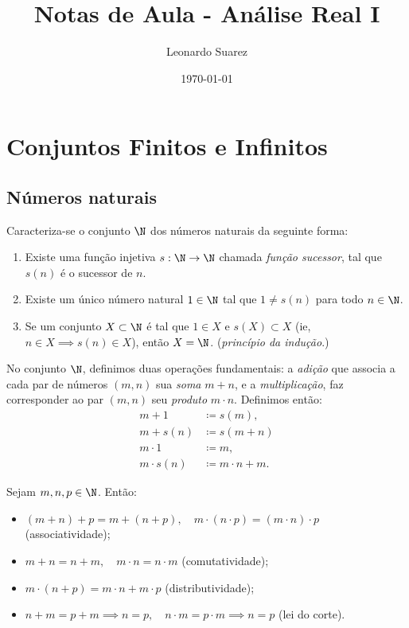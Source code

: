 \documentclass{article}
\title{Notas de Aula - Análise Real I}
\author{Leonardo Suarez}
\date{\today}
\begin{document}
\maketitle
\tableofcontents

\section{Conjuntos Finitos e Infinitos}

\subsection{Números naturais}

Caracteriza-se o conjunto \(\N\) dos números naturais da seguinte forma:

\begin{enumerate}
    \item[\textbf{AI}] Existe uma função injetiva \(s : \N \to \N\) chamada \emph{função sucessor}, tal que \(s(n)\) é o sucessor de \(n\).
    \item[\textbf{AII}] Existe um único número natural \(1 \in \N\) tal que \(1 \neq s(n)\) para todo \(n \in \N\).
    \item[\textbf{AIII}] Se um conjunto \(X \subset \N\) é tal que \(1 \in X\) e \(s(X) \subset X\) (ie, \(n \in X \implies s(n) \in X\)), então \(X = \N\). (\emph{princípio da indução}.)
\end{enumerate}

\begin{defn} 
    No conjunto \(\N\), definimos duas operações fundamentais: a \emph{adição} que associa a cada par de números \((m,n)\) sua \emph{soma} \(m+n\), e a \emph{multiplicação}, faz corresponder ao par \((m,n)\) seu \emph{produto} \(m\cdot n\). Definimos então:
    \begin{align}
        m + 1 &\coloneq s(m), \\
        m + s(n) &\coloneq s(m + n) \\
        m \cdot 1 &\coloneq m, \\
        m \cdot s(n) &\coloneq m \cdot n + m.
    \end{align}
\end{defn}

\begin{prop} 
    Sejam \(m, n, p \in \N\). Então:
    \begin{itemize}
        \item[(i)] \((m+n)+p = m+(n+p), \quad m \cdot (n \cdot p) = (m \cdot n) \cdot p\) (associatividade);
        \item[(ii)] \(m + n = n + m, \quad m \cdot n = n \cdot m\) (comutatividade);
        \item[(iii)] \(m \cdot (n + p) = m \cdot n + m \cdot p\) (distributividade);
        \item[(iv)] \(n + m = p + m \implies n = p, \quad n \cdot m = p \cdot m \implies n = p\) (lei do corte).
    \end{itemize} 
\end{prop}
\end{document}
